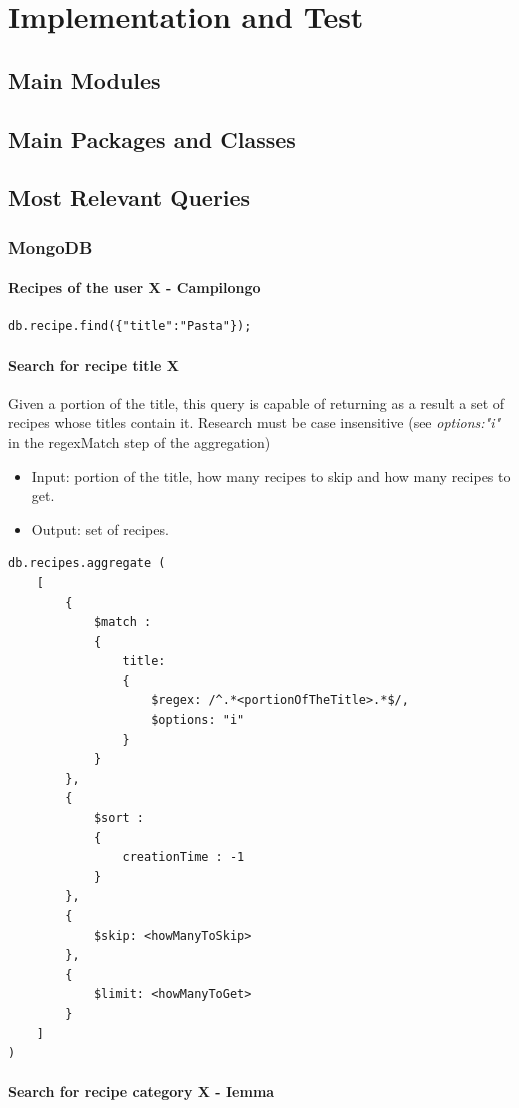\documentclass[a4paper]{report}
\begin{document}
\chapter{Implementation and Test}
\section{Main Modules}
\section{Main Packages and Classes}
\section{Most Relevant Queries}
\subsection{MongoDB}
\subsubsection{Recipes of the user X - Campilongo }

\lstset{ language=C++}
\begin{lstlisting}
db.recipe.find({"title":"Pasta"});
\end{lstlisting}
\subsubsection{Search for recipe title X}
Given a portion of the title, this query is capable of returning as a result a set of recipes whose titles contain it. Research must be case insensitive (see \emph{options:"i"} in the regexMatch step of the aggregation)
\begin{itemize}
\item Input: portion of the title, how many recipes to skip and how many recipes to get.
\item Output: set of recipes.	
\end{itemize}
\lstset{ language=java}
\begin{lstlisting}
db.recipes.aggregate (
	[
		{ 
			$match : 
			{ 
				title: 
				{
					$regex: /^.*<portionOfTheTitle>.*$/,
					$options: "i"
				} 
			}  
		},
		{ 
			$sort : 
			{ 
				creationTime : -1 
			} 
		},
		{ 
			$skip: <howManyToSkip> 
		},
		{ 
			$limit: <howManyToGet> 
		}	
	]
)
\end{lstlisting} 
\subsubsection{Search for recipe category X - Iemma}
\end{document}
